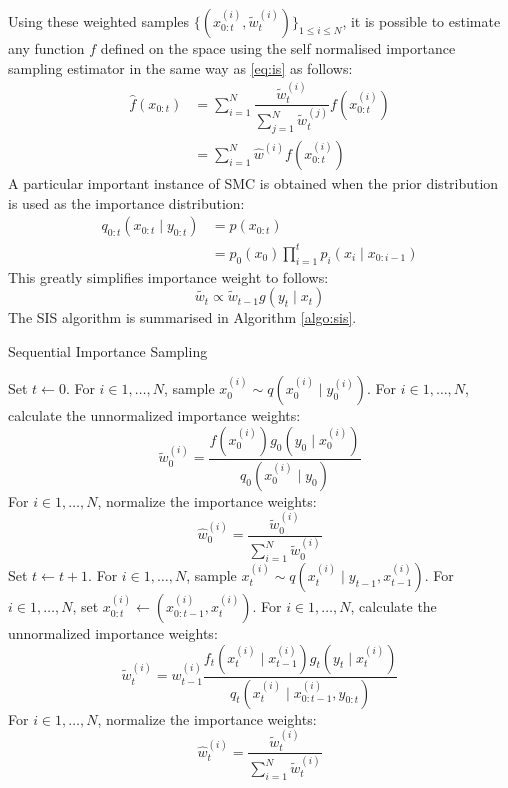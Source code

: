 Using these weighted samples $\{(x^{(i)}_{0:t}, \tilde{w}^{(i)}_t)\}_{1 \leq i \leq N}$, it is possible to estimate any function $f$ defined on the space using the self normalised importance sampling estimator in the same way as \eqref{eq:is} as follows:
\begin{align}
  \hat{f}(x_{0:t}) &= \sum^N_{i=1} \dfrac{\tilde{w}^{(i)}_t}{\sum^N_{j=1}\tilde{w}^{(j)}_t} f(x^{(i)}_{0:t}) \nonumber \\
   &= \sum^N_{i=1} \hat{w}^{(i)} f(x^{(i)}_{0:t})
\end{align}
A particular important instance of SMC is obtained when the prior distribution is used as the importance distribution:
\begin{align}
	q_{0:t}(x_{0:t} \mid y_{0:t}) &= p(x_{0:t}) \nonumber \\
	             &= p_0(x_0) \prod^t_{i=1} p_i(x_i \mid x_{0:i-1})
\label{eq:bf}
\end{align}
This greatly simplifies importance weight to follows:
\begin{equation}
  \tilde{w_t} \propto \tilde{w}_{t-1} g (y_t \mid x_{t}) 
\end{equation}
The SIS algorithm is summarised in Algorithm \ref{algo:sis}.

\begin{algorithm}
\caption{Sequential Importance Sampling}\label{algo:sis}
\begin{algorithmic}[1]
\State Set $t \gets 0$.
\State For $i \in 1, \ldots, N$, sample $x^{(i)}_0 \sim q(x^{(i)}_0 \mid y^{(i)}_0)$.
\State For $i \in 1, \ldots, N$, calculate the unnormalized importance weights:
\begin{equation*}
 \tilde{w}^{(i)}_0 = \dfrac{f(x_0^{(i)})g_0(y_0 \mid x^{(i)}_0)}{q_0(x^{(i)}_0 \mid y_0)}
\end{equation*}
\State For $i \in 1, \ldots, N$, normalize the importance weights:
\begin{equation*}
\hat{w}^{(i)}_0 = \dfrac{\tilde{w}^{(i)}_0}{\sum^N_{i=1} \tilde{w}^{(i)}_0}
\end{equation*}
\State Set $t \gets t + 1$.
\State For $i \in 1, \ldots, N$, sample $x^{(i)}_t \sim q(x^{(i)}_t \mid y_{t-1}, x^{(i)}_{t-1})$.
\State For $i \in 1, \ldots, N$, set $x^{(i)}_{0:t} \gets (x^{(i)}_{0:t-1}, x^{(i)}_t)$.
\State For $i \in 1, \ldots, N$, calculate the unnormalized importance weights:
\begin{equation*}
 \tilde{w}^{(i)}_t = w^{(i)}_{t-1} \dfrac{f_t(x^{(i)}_t \mid x^{(i)}_{t-1})g_t(y_t \mid x^{(i)}_t)}{q_t(x^{(i)}_t \mid x^{(i)}_{0:t-1}, y_{0:t})}
\end{equation*}
\State For $i \in 1, \ldots, N$, normalize the importance weights:
\begin{equation*}
\hat{w}^{(i)}_t = \dfrac{\tilde{w}^{(i)}_t}{\sum^N_{i=1} \tilde{w}^{(i)}_t}
\end{equation*}
\EndWhile
\EndFunction
\end{algorithmic}
\end{algorithm}

